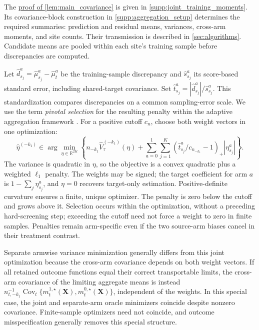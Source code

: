\documentclass[12pt]{article}
\begin{document}
\begin{lemma}\label{lem:main_covariance}
\FACEHDJointCovariance
\end{lemma}

The \hyperref[proof:main_covariance]{proof of \cref*{lem:main_covariance}} is given in \cref{supp:joint_training_moments}. Its covariance-block construction in \cref{supp:aggregation_setup} determines the required summaries: prediction and residual means, variances, cross-arm moments, and site counts. Their transmission is described in \cref{sec:algorithms}. Candidate means are pooled within each site's training sample before discrepancies are computed.

Let $\widehat d_{s_j}^a=\widehat\mu_{s_j}^a-\widehat\mu_t^a$ be the training-sample discrepancy and $\widehat s_{s_j}^a$ its score-based standard error, including shared-target covariance. Set $\widehat t_{s_j}^a=|\widehat d_{s_j}^a|/\widehat s_{s_j}^a$. This standardization compares discrepancies on a common sampling-error scale. We use the term \emph{pivotal selection} for the resulting penalty within the adaptive aggregation framework \citep{han2025federated}. For a positive cutoff $c_n$, choose both weight vectors in one optimization:
\begin{equation}\label{eq:agg_penalized_objective}
\widehat\eta^{(-k_1)}\in\arg\min_{\eta\in\mathbb R^{2K}}
\left\{n_{-k_1}\widehat V_\tau^{(-k_1)}(\eta)
+\sum_{a=0}^1\sum_{j=1}^K(\widehat t_{s_j}^a/c_{n_{-k_1}}-1)_+|\eta_{s_j}^a|\right\}.
\end{equation}
The variance is quadratic in $\eta$, so the objective is a convex quadratic plus a weighted $\ell_1$ penalty. The weights may be signed; the target coefficient for arm $a$ is $1-\sum_j\eta_{s_j}^a$, and $\eta=0$ recovers target-only estimation. Positive-definite curvature ensures a finite, unique optimizer. The penalty is zero below the cutoff and grows above it. Selection occurs within the optimization, without a preceding hard-screening step; exceeding the cutoff need not force a weight to zero in finite samples. Penalties remain arm-specific even if the two source-arm biases cancel in their treatment contrast.

Separate armwise variance minimization generally differs from this joint optimization because the cross-arm covariance depends on both weight vectors. If all retained outcome functions equal their correct transportable limits, the cross-arm covariance of the limiting aggregate means is instead $n_{t,-k_1}^{-1}\operatorname{Cov}_t\{m_t^{1,\star}(\boldsymbol X),m_t^{0,\star}(\boldsymbol X)\}$, independent of the weights. In this special case, the joint and separate-arm oracle minimizers coincide despite nonzero covariance. Finite-sample optimizers need not coincide, and outcome misspecification generally removes this special structure.
\end{document}
